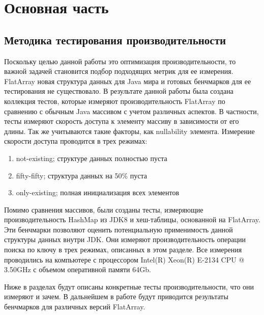 \section{Основная часть}

\subsection{Методика тестирования производительности}
Поскольку целью данной работы это оптимизация производительности, то важной задачей становится подбор подходящих метрик для ее измерения. FlatArray новая структура данных для Java мира и готовых бенчмарков для ее тестирования не существовало. 
В результате данной работы была создана коллекция тестов, которые измеряют производительность FlatArray по сравнению с обычным Java массивом с учетом различных аспектов.
В частности, тесты измеряют скорость доступа к элементу массиву в зависимости от его длины. Так же учитываются такие факторы, как nullability элемента. Измерение скорости доступа проводится в трех режимах:
\begin{enumerate}
	\item not-existing; структуре данных полностью пуста
	\item fifty-fifty; структура данных на 50\% пуста
	\item only-existing; полная инициализация всех элементов
\end{enumerate}
Помимо сравнения массивов, были созданы тесты, измеряющие производительность HashMap из JDK8 и хеш-таблицы, основанной на FlatArray. Эти бенчмарки позволяют оценить потенциальную применимость данной структуры данных внутри JDK. Они измеряют производительность операции поиска по ключу в трех режимах, описанных в этом разделе.
Все измерения проводились на компьютере с процессором Intel(R) Xeon(R) E-2134 CPU @ 3.50GHz
с объемом оперативной памяти 64Gb.
\par
Ниже в разделах будут описаны конкретные тесты производительности, что они измеряют и зачем. В дальнейшем в работе будут приводится результаты бенчмарков для различных версий FlatArray.


